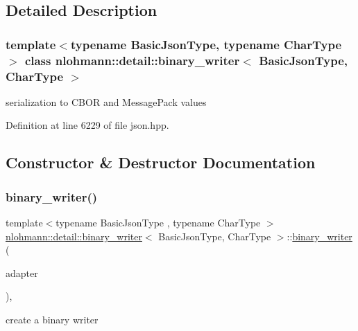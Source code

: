 \subsection{Detailed Description}
\subsubsection*{template$<$typename Basic\+Json\+Type, typename Char\+Type$>$\newline
class nlohmann\+::detail\+::binary\+\_\+writer$<$ Basic\+Json\+Type, Char\+Type $>$}

serialization to C\+B\+OR and Message\+Pack values 

Definition at line 6229 of file json.\+hpp.



\subsection{Constructor \& Destructor Documentation}
\mbox{\label{classnlohmann_1_1detail_1_1binary__writer_a373289af95a946c19bb4a58a5df71a78}} 
\subsubsection{\texorpdfstring{binary\+\_\+writer()}{binary\_writer()}}
{\footnotesize\ttfamily template$<$typename Basic\+Json\+Type , typename Char\+Type $>$ \\
\hyperlink{classnlohmann_1_1detail_1_1binary__writer}{nlohmann\+::detail\+::binary\+\_\+writer}$<$ Basic\+Json\+Type, Char\+Type $>$\+::\hyperlink{classnlohmann_1_1detail_1_1binary__writer}{binary\+\_\+writer} (\begin{DoxyParamCaption}\item[{\hyperlink{namespacenlohmann_1_1detail_a9b680ddfb58f27eb53a67229447fc556}{output\+\_\+adapter\+\_\+t}$<$ Char\+Type $>$}]{adapter }\end{DoxyParamCaption})\hspace{0.3cm}{\ttfamily [inline]}, {\ttfamily [explicit]}}



create a binary writer 


